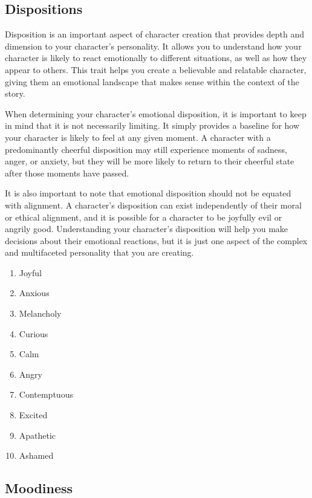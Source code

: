 \hypertarget{dispositions}{%
\subsection{Dispositions}\label{dispositions}}

Disposition is an important aspect of character creation that provides
depth and dimension to your character's personality. It allows you to
understand how your character is likely to react emotionally to
different situations, as well as how they appear to others. This trait
helps you create a believable and relatable character, giving them an
emotional landscape that makes sense within the context of the story.

When determining your character's emotional disposition, it is important
to keep in mind that it is not necessarily limiting. It simply provides
a baseline for how your character is likely to feel at any given moment.
A character with a predominantly cheerful disposition may still
experience moments of sadness, anger, or anxiety, but they will be more
likely to return to their cheerful state after those moments have
passed.

It is also important to note that emotional disposition should not be
equated with alignment. A character's disposition can exist
independently of their moral or ethical alignment, and it is possible
for a character to be joyfully evil or angrily good. Understanding your
character's disposition will help you make decisions about their
emotional reactions, but it is just one aspect of the complex and
multifaceted personality that you are creating.

\begin{enumerate}
\def\labelenumi{\arabic{enumi}.}
\tightlist
\item
  Joyful
\item
  Anxious
\item
  Melancholy
\item
  Curious
\item
  Calm
\item
  Angry
\item
  Contemptuous
\item
  Excited
\item
  Apathetic
\item
  Ashamed
\end{enumerate}

\hypertarget{moodiness}{%
\subsection{Moodiness}\label{moodiness}}

